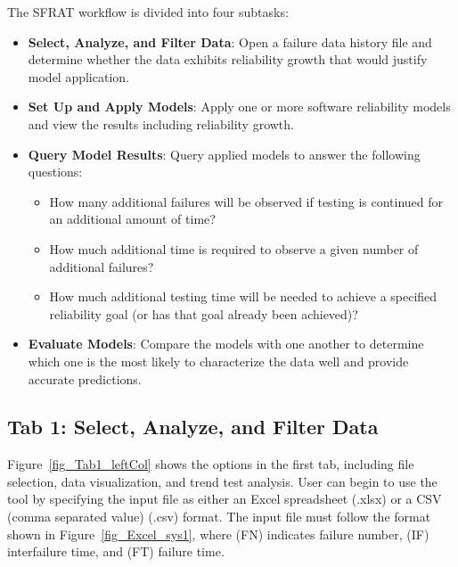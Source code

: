 \documentclass[conference]{IEEEtran}
\begin{document}
The SFRAT workflow is divided into four subtasks:
\begin{itemize}
\item{\textbf{Select, Analyze, and Filter Data}: Open a failure data history file and determine whether the data exhibits reliability growth that would justify model application.}
\item{\textbf{Set Up and Apply Models}: Apply one or more software reliability models and view the results including reliability growth.}
\item{\textbf{Query Model Results}: Query applied models to answer the following questions:
\begin{itemize}
\item{How many additional failures will be observed if testing is continued for an additional amount of time?}
\item{How much additional time is required to observe a given number of additional failures?}
\item{How much additional testing time will be needed to achieve a specified reliability goal (or has that goal already been achieved)?}
\end{itemize}}
\item{\textbf{Evaluate Models}: Compare the models with one another to determine which one is the most likely to characterize the data well and provide accurate predictions.}
\end{itemize}


\subsection{Tab 1: Select, Analyze, and Filter Data}\label{tab1}
Figure~\ref{fig_Tab1_leftCol} shows the options in the first tab, including file selection, data visualization, and trend test analysis. User can begin to use the tool by specifying the input file as either an Excel spreadsheet (.xlsx) or a CSV (comma separated value) (.csv) format. The input file must follow the format shown in Figure~\ref{fig_Excel_sys1}, where (FN) indicates failure number, (IF) interfailure time, and (FT) failure time.
\end{document}
